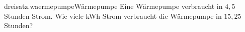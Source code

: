 \begin{exercise}{dreisatz.waermepumpe}{Wärmepumpe}
  \ifproblem\problem
    Eine Wärmepumpe verbraucht in $4,\!5$ Stunden  Strom. Wie viele kWh
    Strom verbraucht die Wärmepumpe in $15,\!25$ Stunden?
  \fi
\end{exercise}
